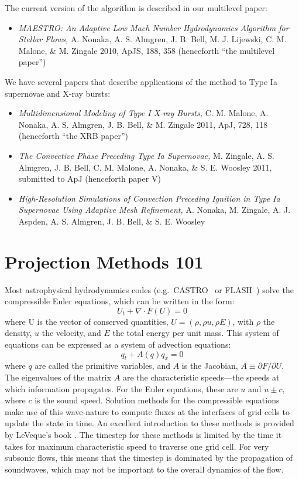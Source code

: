 \noindent The current version of the algorithm is described in our
multilevel paper:
\begin{itemize}
\item {\em MAESTRO: An Adaptive Low Mach Number Hydrodynamics Algorithm for Stellar
  Flows,} A. Nonaka, A. S. Almgren, J. B. Bell, M. J. Lijewski, C. M. Malone,
  \& M. Zingale 2010, ApJS, 188, 358 (henceforth ``the multilevel paper'')
\end{itemize}

\noindent We have several papers that describe applications of the
method to Type Ia supernovae and X-ray bursts:
\begin{itemize}
\item {\em Multidimensional Modeling of Type I X-ray Bursts,}
  C. M. Malone, A. Nonaka, A. S. Almgren, J. B. Bell, \& M. Zingale 2011,
  ApJ, 728, 118 (henceforth ``the XRB paper'')
\item {\em The Convective Phase Preceding Type Ia Supernovae,}
  M. Zingale, A. S. Almgren, J. B. Bell, C. M. Malone, A. Nonaka, \& S. E. Woosley 2011,
  submitted to ApJ (henceforth paper V)
\item {\em High-Resolution Simulations of Convection Preceding Ignition in
  Type Ia Supernovae Using Adaptive Mesh Refinement,}
  A. Nonaka, M. Zingale, A. J. Aspden, A. S. Almgren, J. B. Bell, \& S. E. Woosley
\end{itemize}


\section{Projection Methods 101}

Most astrophysical hydrodynamics codes
(e.g.\ CASTRO~\cite{castro} or FLASH~\cite{flash}) solve the
compressible Euler equations, which can be written in the form:
\begin{equation}
U_t + \nabla \cdot F(U) = 0
\end{equation}
where U is the vector of conserved quantities, $U = (\rho, \rho u,
\rho E)$, with $\rho$ the density, $u$ the velocity, and $E$ the total
energy per unit mass.  This system of equations can be expressed 
as a system of advection equations:
\begin{equation}
q_t + A(q) q_x = 0
\end{equation}
where $q$ are called the primitive variables, and $A$ is the
Jacobian, $A \equiv \partial F / \partial U$.  The eigenvalues of the
matrix $A$ are the characteristic speeds---the speeds at which
information propagates.  For the Euler equations, these are $u$ and $u
\pm c$, where $c$ is the sound speed.  Solution methods for the
compressible equations make use of this wave-nature to compute fluxes
at the interfaces of grid cells to update the state in time.  An
excellent introduction to these methods is provided by LeVeque's book
\cite{leveque}.  The timestep for these methods is limited by the time
it takes for maximum characteristic speed to traverse one grid cell.
For very subsonic flows, this means that the timestep is dominated by
the propagation of soundwaves, which may not be important to the
overall dynamics of the flow.



